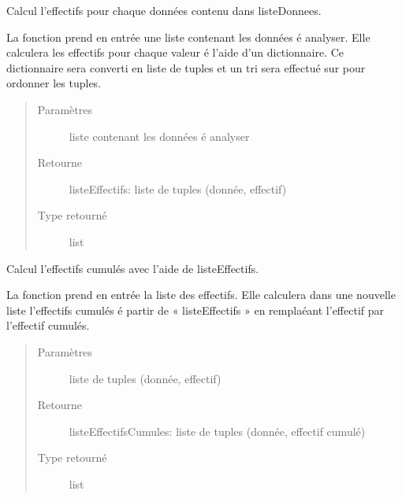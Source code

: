 \documentclass[letterpaper,10pt,french]{sphinxmanual}
\begin{document}
\begin{fulllineitems}
\label{\detokenize{addQualitatives:add.addQualitatives.calculEffectifs}}
Calcul l’effectifs pour chaque données contenu dans listeDonnees.

La fonction prend en entrée une liste contenant les données é analyser. Elle calculera les effectifs pour chaque valeur é 
l’aide d’un dictionnaire. Ce dictionnaire sera converti en liste de tuples et un tri sera effectué sur pour ordonner les
tuples.
\begin{quote}\begin{description}
\item[{Paramètres}] \leavevmode
{} \textendash{} liste contenant les données é analyser

\item[{Retourne}] \leavevmode
listeEffectifs: liste de tuples (donnée, effectif)

\item[{Type retourné}] \leavevmode
list

\end{description}\end{quote}

\end{fulllineitems}


\begin{fulllineitems}
\label{\detokenize{addQualitatives:add.addQualitatives.calculEffectifsCumules}}
Calcul l’effectifs cumulés avec l’aide de listeEffectifs.

La fonction prend en entrée la liste des effectifs. Elle calculera dans une nouvelle liste l’effectifs cumulés é partir 
de « listeEffectifs » en remplaéant l’effectif par l’effectif cumulés.
\begin{quote}\begin{description}
\item[{Paramètres}] \leavevmode
{} \textendash{} liste de tuples (donnée, effectif)

\item[{Retourne}] \leavevmode
listeEffectifsCumules: liste de tuples (donnée, effectif cumulé)

\item[{Type retourné}] \leavevmode
list

\end{description}\end{quote}

\end{fulllineitems}
\end{document}

